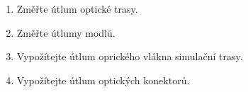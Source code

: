 \begin{minipage}[H][11.48cm][c]{0.8\textwidth}
  \begin{enumerate}
    \item
      Změřte útlum optické trasy.      	
    \item
      Změřte útlumy modlů.
    \item
			Vypožítejte útlum oprického vlákna simulační trasy.
		\item
			Vypožítejte útlum optických konektorů.		
	\end{enumerate}
\end{minipage}



